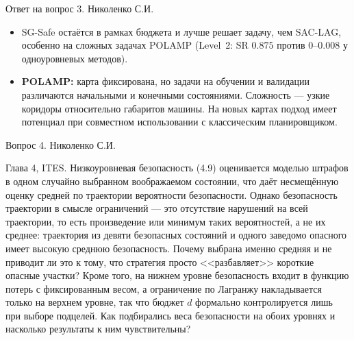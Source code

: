 \begin{frame}[noframenumbering,shrink=10]{Ответ на вопрос 3. Николенко С.И.}
\begin{itemize}
              нарушений за эпизод. MTSC SG-Safe ($20.7$ на Point и Car) остаётся в
              пределах бюджета задачи.
        \item SG-Safe остаётся в рамках бюджета и лучше решает задачу, чем
              SAC-LAG, особенно на сложных задачах POLAMP (Level~2: SR $0.875$
              против $0$--$0.008$ у одноуровневых методов).
        \item \textbf{POLAMP:} карта фиксирована, но задачи на обучении и
              валидации различаются начальными и конечными состояниями.
              Сложность --- узкие коридоры относительно габаритов машины. На
              новых картах подход имеет потенциал при совместном
              использовании с классическим планировщиком.
    \end{itemize}
\end{frame}

\begin{frame}[noframenumbering]{Вопрос 4. Николенко С.И.}
    \begin{block}{}
        \footnotesize
        Глава 4, ITES. Низкоуровневая безопасность (4.9) оценивается моделью
        штрафов в одном случайно выбранном воображаемом состоянии, что даёт
        несмещённую оценку средней по траектории вероятности безопасности.
        Однако безопасность траектории в смысле ограничений --- это отсутствие
        нарушений на всей траектории, то есть произведение или минимум таких
        вероятностей, а не их среднее: траектория из девяти безопасных
        состояний и одного заведомо опасного имеет высокую среднюю
        безопасность. Почему выбрана именно средняя и не приводит ли это к
        тому, что стратегия просто <<разбавляет>> короткие опасные участки?
        Кроме того, на нижнем уровне безопасность входит в функцию потерь с
        фиксированным весом, а ограничение по Лагранжу накладывается только на
        верхнем уровне, так что бюджет $d$ формально контролируется лишь при
        выборе подцелей. Как подбирались веса безопасности на обоих уровнях и
        насколько результаты к ним чувствительны?
    \end{block}
\end{frame}


